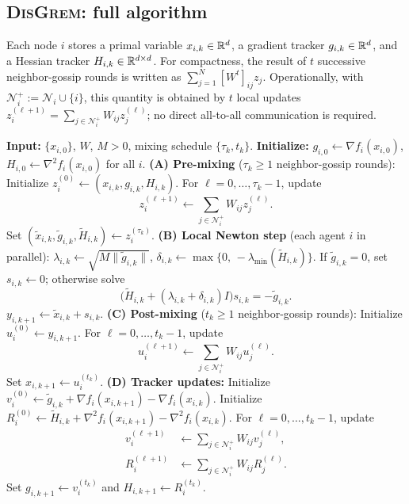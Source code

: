 \documentclass[review,onefignum,onetabnum]{siamart171218}
\begin{document}
	\subsection{\textsc{DisGrem}: full algorithm}\label{ssec:disgrem}
	
	Each node $i$ stores a primal variable $x_{i,k}\in\mathbb{R}^d$, a gradient tracker $g_{i,k}\in\mathbb{R}^d$,
	and a Hessian tracker $H_{i,k}\in\mathbb{R}^{d\times d}$.
	For compactness, the result of $t$ successive neighbor-gossip rounds is written as
	$\sum_{j=1}^N [W^t]_{ij}z_j$. Operationally, with
	$\mathcal N_i^+:=\mathcal N_i\cup\{i\}$, this quantity is obtained by
	$t$ local updates $z_i^{(\ell+1)}=\sum_{j\in\mathcal N_i^+}W_{ij}z_j^{(\ell)}$;
	no direct all-to-all communication is required.
	
	\begin{algorithm}[H]
		\caption{\textsc{DisGrem}}
		\label{alg:disgrem}
		\small
		\begin{algorithmic}[1]
			\State \textbf{Input:} $\{x_{i,0}\}$, $W$, $M>0$, mixing schedule $\{\tau_k, t_k\}$.
			\State \textbf{Initialize:} $g_{i,0}\gets\nabla f_i(x_{i,0})$, $H_{i,0}\gets\nabla^2 f_i(x_{i,0})$ for all $i$.
			\State \textbf{(A) Pre-mixing} ($\tau_k\ge 1$ neighbor-gossip rounds):
			\Statex\qquad Initialize $z_i^{(0)}\gets(x_{i,k},g_{i,k},H_{i,k})$.
			\Statex\qquad For $\ell=0,\ldots,\tau_k-1$, update
			\[
			z_i^{(\ell+1)}
			\gets
			\sum_{j\in\mathcal N_i^+}W_{ij}z_j^{(\ell)}.
			\]
			\Statex\qquad Set $(\tilde x_{i,k},\tilde g_{i,k},\tilde H_{i,k})\gets z_i^{(\tau_k)}$.
			\State \textbf{(B) Local Newton step} (each agent $i$ in parallel):
			\Statex\qquad $\lambda_{i,k}\gets\sqrt{M\|\tilde g_{i,k}\|}$,\quad
			$\delta_{i,k}\gets\max\{0,\,-\lambda_{\min}(\tilde H_{i,k})\}$.
			\Statex\qquad If $\tilde g_{i,k}=0$, set $s_{i,k}\gets0$; otherwise solve
			\[
			\bigl(\tilde H_{i,k}+(\lambda_{i,k}+\delta_{i,k})I\bigr)s_{i,k}
			=-\tilde g_{i,k}.
			\]
			\Statex\qquad $y_{i,k+1}\gets\tilde x_{i,k}+s_{i,k}$.
			\State \textbf{(C) Post-mixing} ($t_k\ge 1$ neighbor-gossip rounds):
			\Statex\qquad Initialize $u_i^{(0)}\gets y_{i,k+1}$.
			\Statex\qquad For $\ell=0,\ldots,t_k-1$, update
			\[
			u_i^{(\ell+1)}
			\gets
			\sum_{j\in\mathcal N_i^+}W_{ij}u_j^{(\ell)}.
			\]
			\Statex\qquad Set $x_{i,k+1}\gets u_i^{(t_k)}$.
			\State \textbf{(D) Tracker updates:}
			\Statex\qquad Initialize $v_i^{(0)}\gets\tilde g_{i,k}+\nabla f_i(x_{i,k+1})-\nabla f_i(x_{i,k})$.
			\Statex\qquad Initialize $R_i^{(0)}\gets\tilde H_{i,k}+\nabla^2 f_i(x_{i,k+1})-\nabla^2 f_i(x_{i,k})$.
			\Statex\qquad For $\ell=0,\ldots,t_k-1$, update
			\[
			\begin{aligned}
			v_i^{(\ell+1)}
			&\gets
			\sum_{j\in\mathcal N_i^+}W_{ij}v_j^{(\ell)},\\
			R_i^{(\ell+1)}
			&\gets
			\sum_{j\in\mathcal N_i^+}W_{ij}R_j^{(\ell)}.
			\end{aligned}
			\]
			\Statex\qquad Set $g_{i,k+1}\gets v_i^{(t_k)}$ and $H_{i,k+1}\gets R_i^{(t_k)}$.
			\EndFor
		\end{algorithmic}
	\end{algorithm}
	
\end{document}
